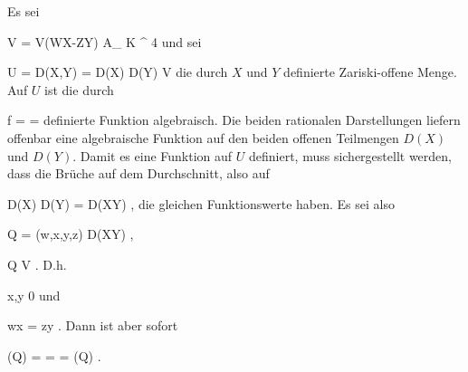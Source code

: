 {





Es sei

\mavergleichskette
{\vergleichskette
{ V
}
{ = }{ V(WX-ZY)
}
{ \subseteq }{ { {\mathbb A}_{  K  }^{  4   } }
}
{    }{
}
{   }{
}
}
{}{}{}
und sei

\mavergleichskette
{\vergleichskette
{ U
}
{ = }{ D(X,Y)
}
{ = }{ D(X) \cup D(Y)
}
{ \subset   }{ V
}
{   }{
}
}
{}{}{}
die durch $X$ und $Y$ definierte Zariski-offene Menge. Auf $U$ ist die durch

\mavergleichskettedisp
{\vergleichskette
{ f
}
{ =} { {  }
}
{ =} { {  }
}
{ } {
}
{ } {
}
}
{}{}{}
definierte Funktion algebraisch. Die beiden rationalen Darstellungen liefern offenbar eine algebraische Funktion auf den beiden offenen Teilmengen $D(X)$ und $D(Y)$. Damit es eine Funktion auf $U$ definiert, muss sichergestellt werden, dass die Brüche auf dem Durchschnitt, also auf

\mavergleichskette
{\vergleichskette
{ D(X) \cap D(Y)
}
{ = }{ D(XY)
}
{  }{
}
{    }{
}
{   }{
}
}
{}{}{,}
die gleichen Funktionswerte haben. Es sei also

\mavergleichskette
{\vergleichskette
{ Q
}
{ = }{ (w,x,y,z)
}
{ \in }{ D(XY)
}
{    }{
}
{   }{
}
}
{}{}{,}

\mavergleichskette
{\vergleichskette
{ Q
}
{ \in }{ V
}
{  }{
}
{    }{
}
{   }{
}
}
{}{}{.}
D.h.

\mavergleichskette
{\vergleichskette
{ x,y
}
{ \neq }{ 0
}
{  }{
}
{    }{
}
{   }{
}
}
{}{}{}
und

\mavergleichskette
{\vergleichskette
{ wx
}
{ = }{ zy
}
{  }{
}
{    }{
}
{   }{
}
}
{}{}{.}
Dann ist aber sofort

\mavergleichskettedisp
{\vergleichskette
{ (Q)
}
{ =} { 
}
{ =} { 
}
{ =} { (Q)
}
{ } {
}
}
{}{}{.}





}





